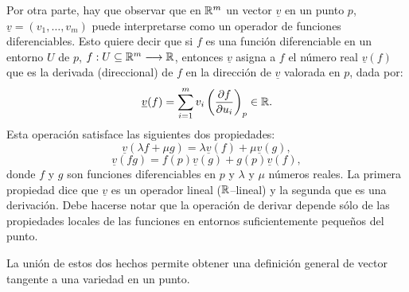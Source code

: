 \documentclass[cursovd_portada.tex]{subfiles}
\begin{document}
\par
Por otra parte, hay que observar que en $\mathbb{R}^m$ un vector $\underline{v}$ en un punto $p$,
$\underline{v}=(v_1,\dots ,v_m)$ puede interpretarse como un operador de funciones diferenciables. Esto quiere
decir que si $f$ es una funci\'{o}n diferenciable en un entorno $U$ de $p$, $f:U\subseteq\mathbb{R}^m\longrightarrow\mathbb{R}$, entonces
$\underline{v}$ asigna a $f$ el n\'{u}mero real $\underline{v}(f)$ que es la derivada (direccional) de $f$ en la
direcci\'{o}n de $\underline{v}$ valorada en $p$, dada por:
$$\underline{v}(f)=\sum_{i=1}^mv_i\left(\displaystyle{\frac{\partial f}{\partial u_i}}\right)_p\in\mathbb{R}.$$
\hs Esta operaci\'{o}n satisface las siguientes dos propiedades:
$$\underline{v}(\lambda f+\mu g)=\lambda\underline{v}(f)+\mu\underline{v}(g),$$
$$\underline{v}(fg)=f(p)\underline{v}(g)+g(p)\underline{v}(f),$$
donde $f$ y $g$ son funciones diferenciables en $p$ y $\lambda$ y $\mu$ n\'{u}meros reales. La primera propiedad dice
que $\underline{v}$ es un operador lineal ($\mathbb{R}$--lineal) y la segunda que es una derivaci\'{o}n. Debe hacerse notar
que la operaci\'{o}n de derivar depende s\'{o}lo de las propiedades locales de las funciones en entornos suficientemente
peque\~{n}os del punto.
\par
La uni\'{o}n de estos dos hechos permite obtener una definici\'{o}n general de vector tangente a una variedad en un punto.
\end{document}

